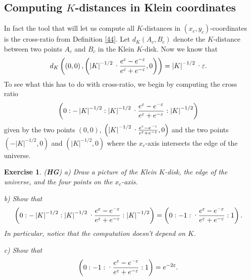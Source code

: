 \documentclass{article}%
\newtheorem{exercise}[theorem]{Exercise}
\begin{document}
\pagebreak

\subsection{Computing $K$-distances in Klein coordinates}

In fact the tool that will let us compute all $K$-distances in $\left(
x_{c},y_{c}\right)  $-coordinates is the cross-ratio from Definition \ref{44}.
Let $d_{K}\left(  A_{c},B_{c}\right)  $ denote the $K$-distance between two
points $A_{c}$ and $B_{c}$ in the Klein $K$-disk. Now we know that
\[
d_{K}\left(  \left(  0,0\right)  ,\left(  \left\vert K\right\vert
^{-1/2}\text{\textperiodcentered}\frac{e^{\varepsilon}-e^{-\varepsilon}%
}{e^{\varepsilon}+e^{-\varepsilon}},0\right)  \right)  =\left\vert
K\right\vert ^{-1/2}\text{\textperiodcentered}\varepsilon.
\]
To see what this has to do with cross-ratio, we begin by computing the cross
ratio%
\[
\left(  0:-\left\vert K\right\vert ^{-1/2}:\left\vert K\right\vert
^{-1/2}\text{\textperiodcentered}\frac{e^{\varepsilon}-e^{-\varepsilon}%
}{e^{\varepsilon}+e^{-\varepsilon}}:\left\vert K\right\vert ^{-1/2}\right)
\]
given by the two points $\left(  0,0\right)  $, $\left(  \left\vert
K\right\vert ^{-1/2}\text{\textperiodcentered}\frac{e^{\varepsilon
}-e^{-\varepsilon}}{e^{\varepsilon}+e^{-\varepsilon}},0\right)  $ and the two
points $\left(  -\left\vert K\right\vert ^{-1/2},0\right)  $ and $\left(
\left\vert K\right\vert ^{-1/2},0\right)  $ where the $x_{c}$-axis intersects
the edge of the universe.

\begin{exercise}
(\textbf{HG}) a) Draw a picture of the Klein $K$-disk, the edge of the
universe, and the four points on the $x_{c}$-axis.

b) Show that%
\[
\left(  0:-\left\vert K\right\vert ^{-1/2}:\left\vert K\right\vert
^{-1/2}\text{\textperiodcentered}\frac{e^{\varepsilon}-e^{-\varepsilon}%
}{e^{\varepsilon}+e^{-\varepsilon}}:\left\vert K\right\vert ^{-1/2}\right)
=\left(  0:-1:\text{\textperiodcentered}\frac{e^{\varepsilon}-e^{-\varepsilon
}}{e^{\varepsilon}+e^{-\varepsilon}}:1\right)  .
\]
In particular, notice that the computation doesn't depend on $K$.

c) Show that%
\[
\left(  0:-1:\text{\textperiodcentered}\frac{e^{\varepsilon}-e^{-\varepsilon}%
}{e^{\varepsilon}+e^{-\varepsilon}}:1\right)  =e^{-2\varepsilon}.
\]

\end{exercise}
\end{document}
